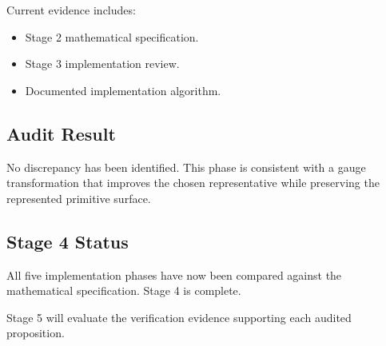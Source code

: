 Current evidence includes:

\begin{itemize}
\item Stage 2 mathematical specification.
\item Stage 3 implementation review.
\item Documented implementation algorithm.
\end{itemize}

\subsection{Audit Result}

No discrepancy has been identified. This phase is consistent with a
gauge transformation that improves the chosen representative while
preserving the represented primitive surface.

\subsection{Stage 4 Status}

All five implementation phases have now been compared against the
mathematical specification. Stage 4 is complete.

Stage 5 will evaluate the verification evidence supporting each audited
proposition.

